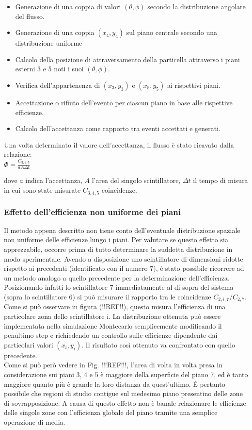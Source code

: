 \documentclass[11pt]{article}
\begin{document}
\begin{flushleft}
\begin{itemize}
\item{Generazione di una coppia di valori $(\theta,\phi)$ secondo la distribuzione angolare del flusso.}\\
\item{Generazione di una coppia $(x_{4},y_{4})$ sul piano centrale secondo una distribuzione uniforme}\\
\item{Calcolo della posizione di attraversamento della particella attraverso i piani esterni 3 e 5 noti i suoi $(\theta,\phi)$.}
\item{Verifica dell'appartenenza di $(x_{3},y_{3})$ e $(x_{5},y_{5})$ ai rispettivi piani.}
\item{Accettazione o rifiuto dell'evento per ciascun piano in base alle rispettive efficienze.}
\item{Calcolo dell'accettanza come rapporto tra eventi accettati e generati.}
\end{itemize}

Una volta determinato il valore dell'accettanza, il flusso è stato ricavato dalla relazione: \\
$
\Phi = \frac{C_{3,4,5}}{a A \Delta t}
$

dove $a$ indica l'accettanza, $A$ l'area del singolo scintillatore, $\Delta t$ il tempo di misura in cui sono state misurate $C_{3,4,5}$ coincidenze.

\subsubsection{Effetto dell'efficienza non uniforme dei piani}
Il metodo appena descritto non tiene conto dell'eventuale distribuzione spaziale non uniforme delle efficienze lungo i piani. Per valutare se questo effetto sia apprezzabile, occorre prima di tutto determinare la suddetta distribuzione in modo sperimentale. Avendo a disposizione uno scintillatore di dimensioni ridotte rispetto ai precedenti (identificato con il numero 7), è stato possibile ricorrere ad un metodo analogo a quello precedente per la determinazione dell'efficienza. Posizionando infatti lo scintillatore 7 immediatamente al di sopra del sistema (sopra lo scintillatore 6) si può misurare il rapporto tra le coincidenze $C_{2,i,7}/C_{2,7}$. Come si può osservare in figura (!!REF!!), questo misura l'efficienza di una particolare zona dello scintillatore i. La distribuzione ottenuta può essere implementata nella simulazione Montecarlo semplicemente modificando il penultimo step e richiedendo un controllo sulle efficienze dipendente dai particolari valori $(x_i,y_i)$. Il risultato così ottenuto va confrontato con quello precedente.\\
Come si può però vedere in Fig. !!!REF!!!, l'area di volta in volta presa in considerazione sui piani 3, 4 e 5 è maggiore della superficie del piano 7, ed è tanto maggiore quanto più è grande la loro distanza da quest'ultimo. \'E pertanto possibile che regioni di studio contigue sul medesimo piano presentino delle zone di sovrapposizione. A causa di questo effetto non è banale relazionare le efficienze delle singole zone con l'efficienza globale del piano tramite una semplice operazione di media.



\end{flushleft}
\end{document}
